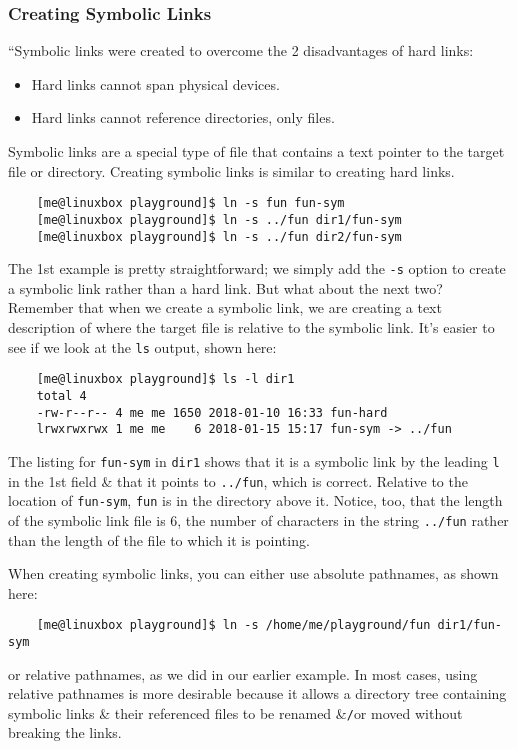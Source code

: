 \documentclass[oneside]{book}
\numberwithin{equation}{section}
\begin{document}
\subsubsection{Creating Symbolic Links}
``Symbolic links were created to overcome the 2 disadvantages of hard links:
\begin{itemize}
	\item Hard links cannot span physical devices.
	\item Hard links cannot reference directories, only files.
\end{itemize}
Symbolic links are a special type of file that contains a text pointer to the target file or directory. Creating symbolic links is similar to creating hard links.
\begin{verbatim}
	[me@linuxbox playground]$ ln -s fun fun-sym
	[me@linuxbox playground]$ ln -s ../fun dir1/fun-sym
	[me@linuxbox playground]$ ln -s ../fun dir2/fun-sym
\end{verbatim}
The 1st example is pretty straightforward; we simply add the \texttt{-s} option to create a symbolic link rather than a hard link. But what about the next two? Remember that when we create a symbolic link, we are creating a text description of where the target file is relative to the symbolic link. It's easier to see if we look at the \texttt{ls} output, shown here:
\begin{verbatim}
	[me@linuxbox playground]$ ls -l dir1
	total 4
	-rw-r--r-- 4 me me 1650 2018-01-10 16:33 fun-hard
	lrwxrwxrwx 1 me me    6 2018-01-15 15:17 fun-sym -> ../fun
\end{verbatim}
The listing for \texttt{fun-sym} in \texttt{dir1} shows that it is a symbolic link by the leading \texttt{l} in the 1st field \& that it points to \texttt{../fun}, which is correct. Relative to the location of \texttt{fun-sym}, \texttt{fun} is in the directory above it. Notice, too, that the length of the symbolic link file is 6, the number of characters in the string \texttt{../fun} rather than the length of the file to which it is pointing.

When creating symbolic links, you can either use absolute pathnames, as shown here:
\begin{verbatim}
	[me@linuxbox playground]$ ln -s /home/me/playground/fun dir1/fun-sym
\end{verbatim}
or relative pathnames, as we did in our earlier example. In most cases, using relative pathnames is more desirable because it allows a directory tree containing symbolic links \& their referenced files to be renamed \&\texttt{/}or moved without breaking the links.
\end{document}
